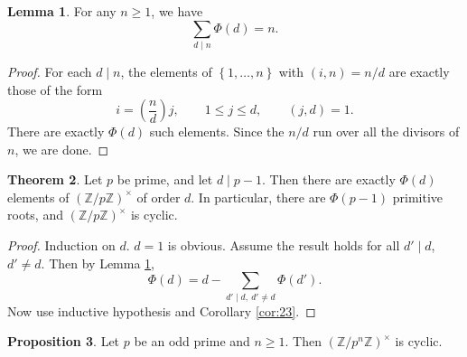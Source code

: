 \documentclass{article}
\newcommand{\Z}{\mathbb{Z}}
\newcommand{\rb}[1]{\left( #1 \right)}
\newcommand{\cb}[1]{\left\{ #1 \right\}}
\newcommand{\unit}[1]{\rb{\Z / #1\Z}^\times}
\theoremstyle{definition}\newtheorem{definition}{Definition}
\theoremstyle{definition}\newtheorem{remark}[definition]{Remark}
\theoremstyle{definition}\newtheorem*{example}{Example}
\theoremstyle{definition}\newtheorem*{note}{Note}
\newtheorem{proposition}[definition]{Proposition}
\newtheorem{lemma}[definition]{Lemma}
\newtheorem{theorem}[definition]{Theorem}
\begin{document}
\begin{lemma}
\label{lem:24}
For any $ n \ge 1 $, we have
$$ \sum_{d \mid n} \Phi\rb{d} = n. $$
\end{lemma}

\begin{proof}
For each $ d \mid n $, the elements of $ \cb{1, \dots, n} $ with $ \rb{i, n} = n / d $ are exactly those of the form
$$ i = \rb{\dfrac{n}{d}}j, \qquad 1 \le j \le d, \qquad \rb{j, d} = 1. $$
There are exactly $ \Phi\rb{d} $ such elements. Since the $ n / d $ run over all the divisors of $ n $, we are done.
\end{proof}

\begin{theorem}
\label{thm:25}
Let $ p $ be prime, and let $ d \mid p - 1 $. Then there are exactly $ \Phi\rb{d} $ elements of $ \unit{p} $ of order $ d $. In particular, there are $ \Phi\rb{p - 1} $ primitive roots, and $ \unit{p} $ is cyclic.
\end{theorem}

\begin{proof}
Induction on $ d $. $ d = 1 $ is obvious. Assume the result holds for all $ d' \mid d $, $ d' \ne d $. Then by Lemma \ref{lem:24},
$$ \Phi\rb{d} = d - \sum_{d' \mid d, \ d' \ne d} \Phi\rb{d'}. $$
Now use inductive hypothesis and Corollary \ref{cor:23}.
\end{proof}


\begin{proposition}
Let $ p $ be an odd prime and $ n \ge 1 $. Then $ \unit{p^n} $ is cyclic.
\end{proposition}
\end{document}

